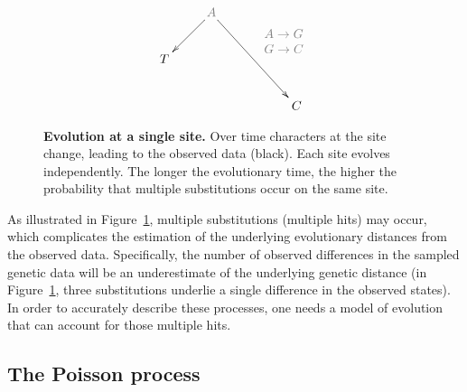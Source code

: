 \begin{figure}[H]
\centering
\begingroup
\everymath{\displaystyle}
{\Large
\begin{displaymath} %
\xymatrix{
& \color{gray2}A \ar[dl] \ar[drdr]^{ \color{gray2}\begin{array}{c}
A\rightarrow G\\
G\rightarrow C
\end{array}} & & \\
T & & & \\
& & & C \\
}
\end{displaymath}
}%
\endgroup
\caption{
{ \footnotesize 
{\bf Evolution at a single site.} Over time characters at the site change, leading to the observed data (black). 
Each site evolves independently.
The longer the evolutionary time, the higher the probability that multiple substitutions occur on the same site.
}%
}
\label{fig:alignment}
\end{figure}

As illustrated in Figure~\ref{fig:alignment}, multiple substitutions (multiple hits) may occur, which complicates the estimation of the underlying evolutionary distances from the observed data.
Specifically, the number of observed differences in the sampled genetic data will be an underestimate of the underlying genetic distance (in Figure~\ref{fig:alignment}, three substitutions underlie a single difference in the observed states).
In order to accurately describe these processes, one needs a model of evolution that can account for those multiple hits.

\subsection{The Poisson process\label{sub:poisson}}

